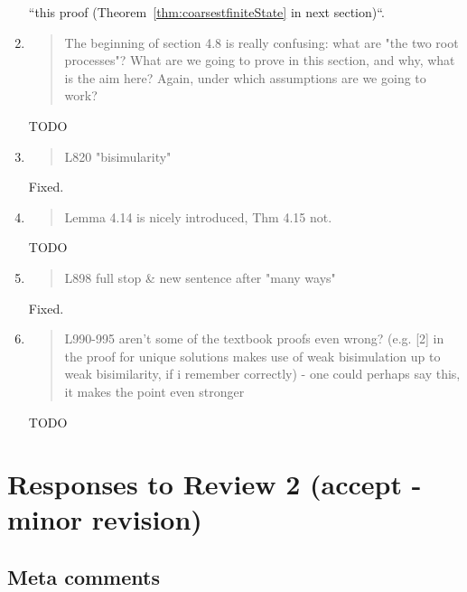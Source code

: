 \begin{enumerate}
  ``this proof (Theorem~\ref{thm:coarsestfiniteState} in next
  section)``.
  
\item \begin{quote}
    The beginning of section 4.8 is really confusing: what are "the
    two root processes"? What are we going to prove in this section,
    and why, what is the aim here? Again, under which assumptions are
    we going to work?
  \end{quote}

  TODO
  
\item \begin{quote}
    L820 "bisimularity"
  \end{quote}
  Fixed.
  
\item \begin{quote}
    Lemma 4.14 is nicely introduced, Thm 4.15 not. 
  \end{quote}

  TODO
  
\item \begin{quote}
    L898 full stop \& new sentence after "many ways"
  \end{quote}
  Fixed.
  
\item \begin{quote}
    L990-995 aren't some of the textbook proofs even wrong? (e.g. [2]
    in the proof for unique solutions makes use of weak bisimulation
    up to weak bisimilarity, if i remember correctly) - one could
    perhaps say this, it makes the point even stronger
  \end{quote}

  TODO
  
\end{enumerate}

\section*{Responses to Review 2 (accept - minor revision)}

\subsection*{Meta comments}

